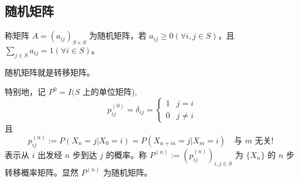 \documentclass[lang=cn,10pt,thmcnt=section]{elegantbook}
\begin{document}
\subsection{随机矩阵}
\begin{definition}[随机矩阵]
	称矩阵 $A = (a_{ij})_{S \times S}$ 为随机矩阵，若 $a_{ij} \geq 0 (\forall i, j \in S)$，且 $\sum_{j \in S} a_{ij} = 1 (\forall i \in S)$。
\end{definition}
\begin{remark}
	随机矩阵就是转移矩阵。
\end{remark}
特别地，记 $P^0 = I(S$ 上的单位矩阵),
\[
p_{ij}^{(0)} = \delta_{ij} = 
\begin{cases} 
1 & j = i \\
0 & j \neq i 
\end{cases}
\]
且
\[
p_{ij}^{(n)} := P(X_n = j | X_0 = i) = P(X_{n+m} = j | X_m = i) \quad \text{与 } m \text{ 无关! }
\]
表示从 $i$ 出发经 $n$ 步到达 $j$ 的概率。称 $P^{(n)} := (p_{ij}^{(n)})_{i,j \in S}$ 为 $\{X_n\}$ 的 $n$ 步转移概率矩阵。显然 $P^{(n)}$ 为随机矩阵。
\end{document}
